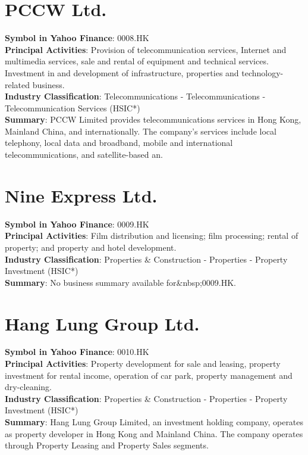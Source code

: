 \section{PCCW Ltd.}
\textbf{Symbol in Yahoo Finance}: 0008.HK\\
\textbf{Principal Activities}: Provision of telecommunication services, Internet and multimedia services, sale and rental of equipment and technical services. Investment in and development of infrastructure, properties and technology-related business.\\
\textbf{Industry Classification}: Telecommunications - Telecommunications - Telecommunication Services (HSIC*)\\
\textbf{Summary}: PCCW Limited provides telecommunications services in Hong Kong, Mainland China, and internationally. The company's services include local telephony, local data and broadband, mobile and international telecommunications, and satellite-based an.


\section{Nine Express Ltd.}
\textbf{Symbol in Yahoo Finance}: 0009.HK\\
\textbf{Principal Activities}: Film distribution and licensing; film processing; rental of property; and property and hotel development.\\
\textbf{Industry Classification}: Properties \& Construction - Properties - Property Investment (HSIC*)\\
\textbf{Summary}: No business summary available for\&nbsp;0009.HK.


\section{Hang Lung Group Ltd.}
\textbf{Symbol in Yahoo Finance}: 0010.HK\\
\textbf{Principal Activities}: Property development for sale and leasing, property investment for rental income, operation of car park, property management and dry-cleaning.\\
\textbf{Industry Classification}: Properties \& Construction - Properties - Property Investment (HSIC*)\\
\textbf{Summary}: Hang Lung Group Limited, an investment holding company, operates as property developer in Hong Kong and Mainland China. The company operates through Property Leasing and Property Sales segments.


